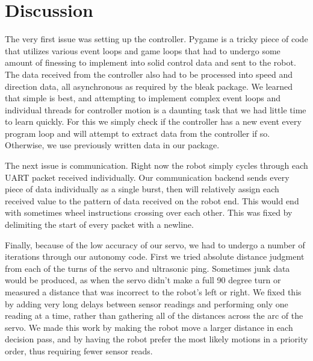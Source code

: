 \documentclass[letterpaper,11pt]{texMemo} %
\begin{document}
\section*{Discussion}
The very first issue was setting up the controller. Pygame is a tricky piece of code 
that utilizes various event loops and game loops that had to undergo some amount 
of finessing to implement into solid control data and sent to the robot. The data 
received from the controller also had to be processed into speed and direction data, 
all asynchronous as required by the bleak package. We learned that simple is best, 
and attempting to implement complex event loops and individual threads for controller 
motion is a daunting task that we had little time to learn quickly. For this we 
simply check if the controller has a new event every program loop and will attempt 
to extract data from the controller if so. Otherwise, we use previously written data 
in our package.

The next issue is communication. Right now the robot simply cycles through each UART
packet received individually. Our communication backend sends every piece of data 
individually as a single burst, then will relatively assign each received value to 
the pattern of data received on the robot end. This would end with sometimes 
wheel instructions crossing over each other. This was fixed by delimiting the start of every packet with a newline.

Finally, because of the low accuracy of our servo, we had to undergo a number of iterations 
through our autonomy code. First we tried absolute distance judgment from each of the turns 
of the servo and ultrasonic ping. Sometimes junk data would be produced, as when the servo 
didn't make a full 90 degree turn or measured a distance that was incorrect 
to the robot's left or right. We fixed this by adding very long delays between sensor readings and performing only one reading at a time, rather than gathering all of the distances across the arc of the servo. We made this work by making the robot move a larger distance in each decision pass, and by having the robot prefer the most likely motions in a priority order, thus requiring fewer sensor reads.


 

\newpage
\end{document}
